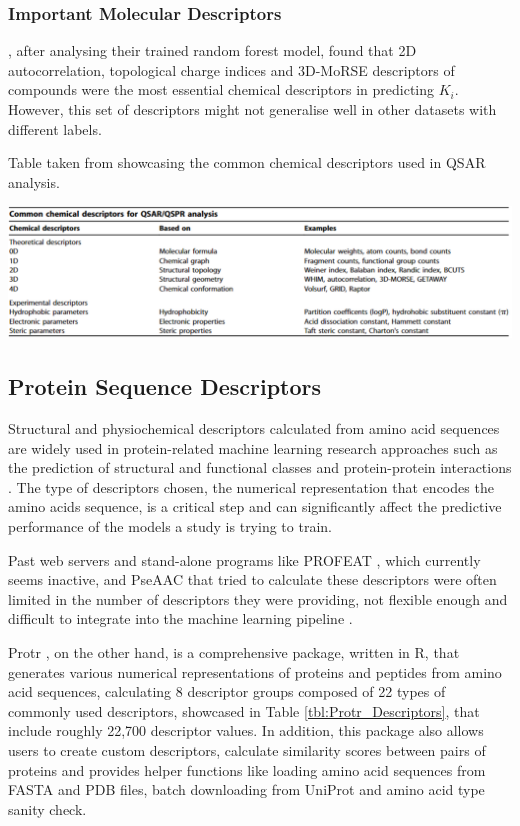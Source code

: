 \subsubsection{Important Molecular Descriptors}

\citet{Shar2016}, after analysing their trained random forest model, found that 2D autocorrelation, topological charge indices and 3D-MoRSE descriptors of compounds were the most essential chemical descriptors in predicting $K_i$. However, this set of descriptors might not generalise well in other datasets with different labels.

\begin{table}[!ht]
  \caption{Table taken from \citet{Lo2018} showcasing the common chemical descriptors used in QSAR analysis.}
  \label{tbl:Common_Chemical_Descriptors}
  \includegraphics[width=1.0\linewidth]{images/QSAR_Descriptors.pdf}
\end{table}

\pagebreak

\subsection{Protein Sequence Descriptors}

Structural and physiochemical descriptors calculated from amino acid sequences are widely used in protein-related machine learning research approaches such as the prediction of structural and functional classes and protein-protein interactions \citep{ProtR_Paper}. The type of descriptors chosen, the numerical representation that encodes the amino acids sequence, is a critical step and can significantly affect the predictive performance of the models a study is trying to train. 

Past web servers and stand-alone programs like PROFEAT \citep{PROFEAT}, which currently seems inactive, and PseAAC \citep{PseAAC} that tried to calculate these descriptors were often limited in the number of descriptors they were providing, not flexible enough and difficult to integrate into the machine learning pipeline \citep{ProtR_Paper}.

Protr \citep{ProtR_Paper}, on the other hand, is a comprehensive package, written in R, that generates various numerical representations of proteins and peptides from amino acid sequences, calculating 8 descriptor groups composed of 22 types of commonly used descriptors, showcased in Table \ref{tbl:Protr_Descriptors}, that include roughly 22,700 descriptor values. In addition, this package also allows users to create custom descriptors, calculate similarity scores between pairs of proteins and provides helper functions like loading amino acid sequences from FASTA and PDB files, batch downloading from UniProt \citep{UniProt_Paper} and amino acid type sanity check.

